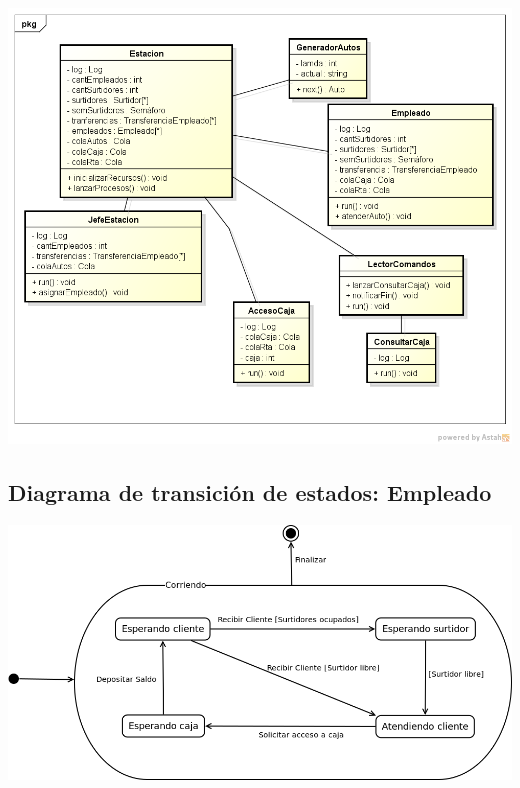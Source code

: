 \documentclass{article}
\begin{document}
\includegraphics[width=\textwidth]{ClassDiagram2}
\newpage
\subsection{Diagrama de transición de estados: Empleado}
\includegraphics[width=\textwidth]{diagramaTransicionEstadosEmpleado}



\end{document}
